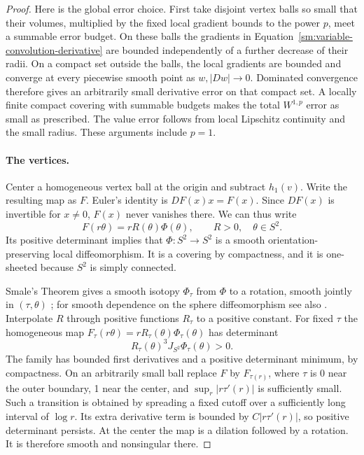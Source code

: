 \documentclass[11pt]{article}
\numberwithin{equation}{section}
\theoremstyle{definition}
\theoremstyle{remark}
\begin{document}
\begin{proof}
Here is the global error choice.  First take disjoint vertex balls
so small that their volumes, multiplied by the fixed local
gradient bounds to the power $p$, meet a summable error budget.
On these balls the gradients in
Equation~\eqref{sm:variable-convolution-derivative} are bounded independently
of a further decrease of their radii.  On a compact set outside
the balls, the local gradients are bounded and converge at every
piecewise smooth point as $w,|Dw|\to0$.  Dominated convergence
therefore gives an arbitrarily small derivative error on that
compact set.  A locally finite compact covering with summable
budgets makes the total $W^{1,p}$ error as small as prescribed.
The value error follows from local Lipschitz continuity and the
small radius.  These arguments include $p=1$.

\paragraph{The vertices.}
Center a homogeneous vertex ball at the origin and subtract
$h_1(v)$.  Write the resulting map as $F$.  Euler's identity is
$DF(x)x=F(x)$.  Since $DF(x)$ is invertible for $x\ne0$, $F(x)$
never vanishes there.  We can thus write
\begin{equation}
 \label{sm:vertex-form}
 F(r\theta)=rR(\theta)\Phi(\theta),\qquad
 R>0,\quad\theta\in S^2.
\end{equation}
Its positive determinant implies that $\Phi:S^2\to S^2$ is a
smooth orientation-preserving local diffeomorphism.  It is a
covering by compactness, and it is one-sheeted because $S^2$ is
simply connected.

Smale's Theorem gives a smooth isotopy $\Phi_\tau$ from $\Phi$
to a rotation, smooth jointly in $(\tau,\theta)$
\cite[Theorem~6]{Smale1959}; for smooth dependence on the sphere
diffeomorphism see also
\cite[Theorem~1.5]{LiWatts2011}.  Interpolate $R$ through positive
functions $R_\tau$ to a positive constant.  For fixed $\tau$ the
homogeneous map
$F_\tau(r\theta)=rR_\tau(\theta)\Phi_\tau(\theta)$
has determinant
\[
 R_\tau(\theta)^3 J_{S^2}\Phi_\tau(\theta)>0.
\]
The family has bounded first derivatives and a positive
determinant minimum, by compactness.  On an arbitrarily small
ball replace $F$ by $F_{\tau(r)}$, where $\tau$ is 0 near the
outer boundary, 1 near the center, and
$\sup_r|r\tau'(r)|$ is sufficiently small.  Such a transition
is obtained by spreading a fixed cutoff over a sufficiently
long interval of $\log r$.  Its extra derivative term is
bounded by $C|r\tau'(r)|$, so positive determinant persists.
At the center the map is a dilation followed by a rotation.
It is therefore smooth and nonsingular there.


\end{proof}
\end{document}
